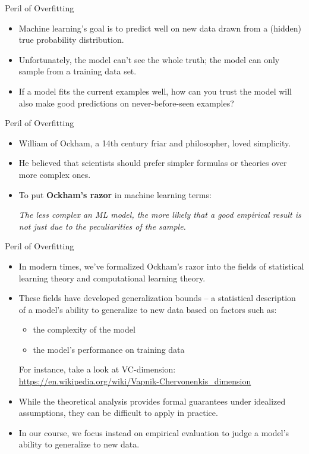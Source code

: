 \documentclass{beamer}
\begin{document}
\begin{frame}{Peril of Overfitting}
\begin{itemize}
\item Machine learning's goal is to predict well on new data drawn from a (hidden) true probability distribution. 
\item Unfortunately, the model can't see the whole truth; the model can only sample from a training data set. 
\item If a model fits the current examples well, how can you trust the model will also make good predictions on never-before-seen examples?
\end{itemize}
\end{frame}

\begin{frame}{Peril of Overfitting}
\begin{itemize}
    \item William of Ockham, a 14th century friar and philosopher, loved simplicity. 
    \item He believed that scientists should prefer simpler formulas or theories over more complex ones. 
    \item To put {\bf Ockham's razor} in machine learning terms:
    
    \medskip
    \emph{The less complex an ML model, the more likely that a good empirical result is not just due to the peculiarities of the sample.}
\end{itemize}
\end{frame}

\begin{frame}{Peril of Overfitting}
\begin{itemize}
    \item In modern times, we've formalized Ockham's razor into the fields of statistical learning theory and computational learning theory. 
    \item These fields have developed generalization bounds -- a statistical description of a model's ability to generalize to new data based on factors such as:
    \begin{itemize}
        \item the complexity of the model
        \item the model's performance on training data
    \end{itemize}
    For instance, take a look at VC-dimension:
    {\footnotesize \url{https://en.wikipedia.org/wiki/Vapnik-Chervonenkis\_dimension}}
    \item While the theoretical analysis provides formal guarantees under idealized assumptions, they can be difficult to apply in practice. 
    \item In our course, we focus instead on empirical evaluation to judge a model's ability to generalize to new data.
\end{itemize}
\end{frame}
\end{document}
